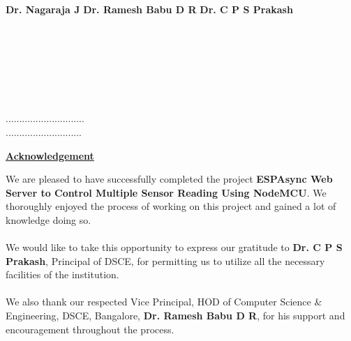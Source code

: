 \documentclass[12pt,a4paper,twocolumn,fleqn]{article}
\begin{document}
\\
\textbf{Dr. Nagaraja J}
\hfill
\hfill
\textbf{Dr. Ramesh Babu D R}
\hfill
\textbf{Dr. C P S Prakash} \\
\hfill 
{}
\hfill
{} \\
\hfill
{}
\hfill
{} \\
\\
\\
\hfill
{}
\hfill
{} \\
\\
\hfill
{} \\
\hfill{.............................} \\
\hfill{............................} \\
\newpage
  \pagestyle{fancy}
  \fancyhf{}
\renewcommand{\headrulewidth}{0pt}
\begin{center} 
\LARGE{{\textbf{\underline{Acknowledgement}}}} \\
\end{center}
\normalsize
We are pleased to have successfully completed the project \textbf{ESPAsync Web Server to Control Multiple Sensor Reading Using NodeMCU}. We thoroughly enjoyed the process of working on this project and gained a lot of knowledge doing so.
\\
\hfill
\\
We would like to take this opportunity to express our gratitude to \textbf{Dr. C P S Prakash}, Principal of DSCE, for permitting us to utilize all the necessary facilities of the institution.
\\
\hfill
\\
We also thank our respected Vice Principal, HOD of Computer Science \& Engineering, DSCE, Bangalore,\textbf{ Dr. Ramesh Babu D R}, for his support and encouragement throughout the process.
\end{document}
